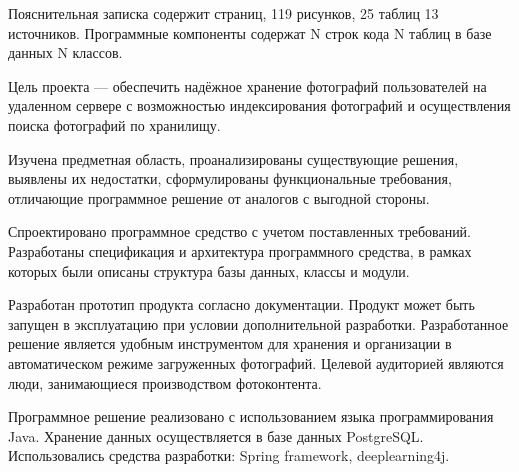 
Пояснительная записка содержит \pageref{LastPage} страниц, 119 рисунков, 25 таблиц 13 источников.
Программные компоненты содержат N строк кода N таблиц в базе данных N классов.

Цель проекта — обеспечить надёжное хранение фотографий пользователей на удаленном сервере с возможностью индексирования фотографий и осуществления поиска фотографий по хранилищу. 

Изучена предметная область, проанализированы существующие решения, выявлены их недостатки, сформулированы функциональные требования, отличающие программное решение от аналогов с выгодной стороны.

Спроектировано программное средство с учетом поставленных требований.
Разработаны спецификация и архитектура программного средства, в рамках которых были описаны структура базы данных, классы и модули.

Разработан прототип продукта согласно документации. 
Продукт может быть запущен в эксплуатацию при условии дополнительной разработки.
Разработанное решение является удобным инструментом для хранения и организации в автоматическом режиме загруженных фотографий.
Целевой аудиторией являются люди, занимающиеся производством фотоконтента.

Программное решение реализовано с использованием языка программирования Java. Хранение данных осуществляется в базе данных PostgreSQL. Использовались средства разработки: Spring framework, deeplearning4j.

\clearpage